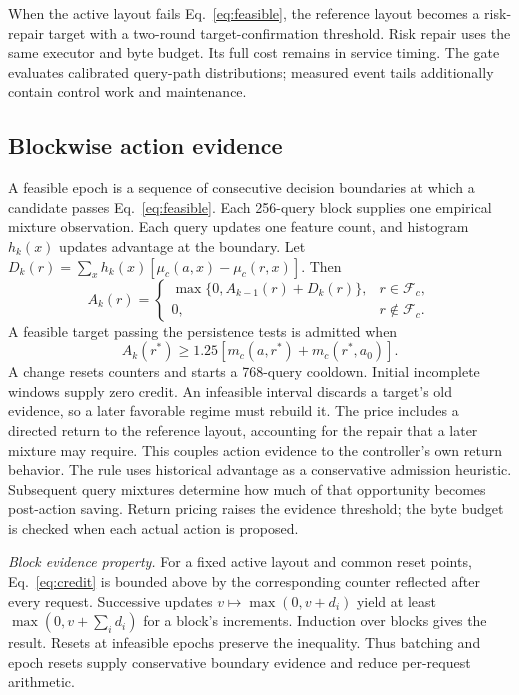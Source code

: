 When the active layout fails Eq.~\eqref{eq:feasible}, the reference layout becomes a risk-repair target with a two-round target-confirmation threshold. Risk repair uses the same executor and byte budget. Its full cost remains in service timing. The gate evaluates calibrated query-path distributions; measured event tails additionally contain control work and maintenance.

\subsection{Blockwise action evidence}
A feasible epoch is a sequence of consecutive decision boundaries at which a candidate passes Eq.~\eqref{eq:feasible}. Each 256-query block supplies one empirical mixture observation. Each query updates one feature count, and histogram $h_k(x)$ updates advantage at the boundary. Let $D_k(r)=\sum_xh_k(x)[\mu_c(a,x)-\mu_c(r,x)]$. Then
\begin{equation}
A_k(r)=\begin{cases}
\max\{0,A_{k-1}(r)+D_k(r)\},&r\in\mathcal F_c,\\
0,&r\notin\mathcal F_c.
\end{cases}
\label{eq:credit}
\end{equation}
A feasible target passing the persistence tests is admitted when
\begin{equation}
A_k(r^*)\geq1.25[m_c(a,r^*)+m_c(r^*,a_0)].
\label{eq:admission}
\end{equation}
A change resets counters and starts a 768-query cooldown. Initial incomplete windows supply zero credit. An infeasible interval discards a target's old evidence, so a later favorable regime must rebuild it. The price includes a directed return to the reference layout, accounting for the repair that a later mixture may require. This couples action evidence to the controller's own return behavior. The rule uses historical advantage as a conservative admission heuristic. Subsequent query mixtures determine how much of that opportunity becomes post-action saving. Return pricing raises the evidence threshold; the byte budget is checked when each actual action is proposed.

\textit{Block evidence property.} For a fixed active layout and common reset points, Eq.~\eqref{eq:credit} is bounded above by the corresponding counter reflected after every request. Successive updates $v\mapsto\max(0,v+d_i)$ yield at least $\max(0,v+\sum_i d_i)$ for a block's increments. Induction over blocks gives the result. Resets at infeasible epochs preserve the inequality. Thus batching and epoch resets supply conservative boundary evidence and reduce per-request arithmetic.

